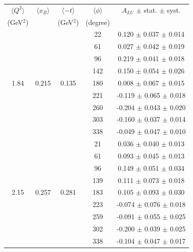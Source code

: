 \documentclass[aps,prc,preprint,superscriptaddress]{revtex4}
\begin{document}
\begin{table}[!h]
   \begin{center}
      \begin{tabular}{|c|c|c|c|c|}
         \hline
 $\langle Q^{2} \rangle$ & $\langle x_{B} \rangle$ & $\langle -t \rangle$ & $\langle \phi \rangle$ & $A_{LU}$ $\pm$ stat. $\pm$ syst.\\
 (GeV$^{2}$) &           & (GeV$^{2}$) & (degree) &  \\
  \hline
        &       &        &   22    &  0.120   $\pm$  0.037  $\pm$ 0.014  \\ 
        &       &        &   61    &  0.027   $\pm$  0.042  $\pm$ 0.019  \\ 
        &       &        &   96    &  0.219   $\pm$  0.041  $\pm$ 0.018  \\ 
        &       &        &  142    &  0.150   $\pm$  0.054  $\pm$ 0.026  \\ 
  1.84  & 0.215 & 0.135  &  180    &  0.008   $\pm$  0.067  $\pm$ 0.015  \\ 
        &       &        &  221    & -0.119   $\pm$  0.065  $\pm$ 0.018  \\ 
        &       &        &  260    & -0.204   $\pm$  0.043  $\pm$ 0.020  \\ 
        &       &        &  303    & -0.160   $\pm$  0.037  $\pm$ 0.014  \\ 
        &       &        &  338    & -0.049   $\pm$  0.047  $\pm$ 0.010  \\ 
  \hline 
        &       &        &   21    &  0.036   $\pm$  0.040  $\pm$ 0.013  \\
        &       &        &   61    &  0.093   $\pm$  0.045  $\pm$ 0.013  \\
        &       &        &   96    &  0.149   $\pm$  0.051  $\pm$ 0.034  \\
        &       &        &  139    &  0.111   $\pm$  0.073  $\pm$ 0.018  \\
  2.15  & 0.257 & 0.281  &  183    &  0.105   $\pm$  0.093  $\pm$ 0.030  \\
        &       &        &  223    & -0.074   $\pm$  0.076  $\pm$ 0.018  \\
        &       &        &  259    & -0.091   $\pm$  0.055  $\pm$ 0.025  \\
        &       &        &  302    & -0.200   $\pm$  0.039  $\pm$ 0.025  \\
        &       &        &  338    & -0.104   $\pm$  0.047  $\pm$ 0.017  \\
  \hline 

\end{tabular}
\end{center}
\end{table}
\end{document}
